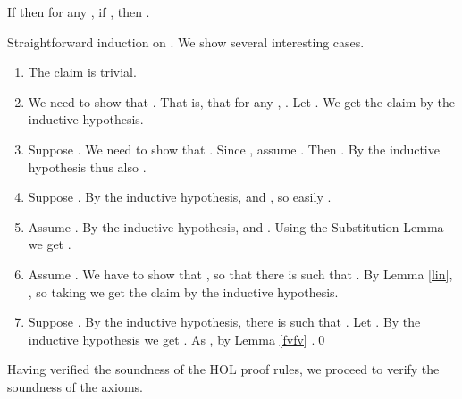 \documentclass{LMCS}
\newcommand{\ignore}[1]{}
\begin{document}
\begin{thm}[Soundness]
If  then for any , if , then .
\end{thm}
\proof
Straightforward induction on . We show several interesting cases. 
\begin{enumerate}[]
\item 

The claim is trivial.
\item 

We need to show that . That is, that for any , . Let . We get the claim by the inductive hypothesis. 
\ignore{
\item  

Suppose . By IH,  and , so . 
\item

Reverse the previous case to get the claims.
}
\ignore
{
\item 

The first two cases are easy. For the last one, suppose . By
IH, we know that , so either  or . In both cases, by the rest of IH, , so we get the
claim.
}	
\item 

Suppose . We need to show that . Since , assume . Then . By the inductive hypothesis
 thus also . 
\item 

Suppose . By the inductive hypothesis,  and , so easily .
\item 

Assume . By the inductive hypothesis,  and . 
Using the Substitution Lemma we get .
\item 

Assume . We have to show that , so that there is  such that . By Lemma \ref{lin}, , so taking  we get the claim by the inductive hypothesis. 
\item 

Suppose . By the inductive hypothesis, there is  such that . Let . By the inductive hypothesis we get . As , by Lemma \ref{fvfv} .\qed
\end{enumerate}

Having verified the soundness of the HOL proof rules, we proceed to verify
the soundness of the axioms.
\end{document}
